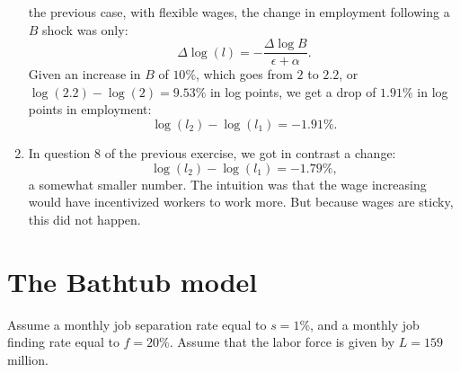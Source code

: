 \documentclass[]{book}
\theoremstyle{definition}
\theoremstyle{definition}
\theoremstyle{definition}
\theoremstyle{remark}
\begin{document}
\begin{enumerate}
  the previous case, with flexible wages, the change in employment
  following a \(B\) shock was only:
  \[\Delta \log(l) =- \frac{\Delta \log B}{\epsilon+\alpha}.\] Given an
  increase in \(B\) of \(10\%\), which goes from \(2\) to \(2.2\), or
  \(\log(2.2)-\log(2)=9.53\%\) in log points, we get a drop of
  \(1.91\%\) in log points in employment:
  \[\log(l_2)-\log(l_1)=-1.91\%.\]
\item
  In question 8 of the previous exercise, we got in contrast a change:
  \[\log(l_2)-\log(l_1)=-1.79\%,\] a somewhat smaller number. The
  intuition was that the wage increasing would have incentivized workers
  to work more. But because wages are sticky, this did not happen.
\end{enumerate}

\section*{The Bathtub model}\label{the-bathtub-model-1}

Assume a monthly job separation rate equal to \(s=1\)\%, and a monthly
job finding rate equal to \(f=20\)\%. Assume that the labor force is
given by \(L=159\) million.
\end{document}
